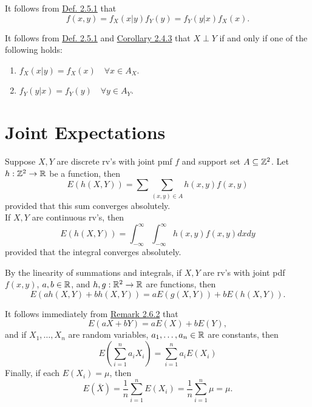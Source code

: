 \documentclass[11pt,fleqn]{book} %
\begin{document}
\begin{remark} It follows from \hyperref[def:251]{Def. 2.5.1} that
\[
f(x, y) = f_X(x | y) f_Y(y) = f_Y(y|x)f_X(x).
\]
\end{remark}

\begin{remark} It follows from \hyperref[def:251]{Def. 2.5.1} and \hyperref[cor:243]{Corollary 2.4.3} that \(X \perp Y\) if and only if one of the following holds:
\begin{enumerate}
\item \(f_X(x|y) = f_X(x) \quad \forall x \in A_X\).
\item \(f_Y(y|x) = f_Y(y) \quad \forall y \in A_Y\).
\end{enumerate}
\end{remark}


\section{Joint Expectations}

\begin{definition} 
Suppose \(X, Y\) are discrete rv's with joint pmf \(f\) and support set \(A \subseteq \mathbb{Z}^2\). Let \(h: \mathbb{Z}^2 \rightarrow \mathbb{R}\) be a function, then
\[
E(h(X, Y)) = \sum\sum_{(x, y) \in A} h(x, y)f(x, y)
\]
provided that this sum converges absolutely.\\
\indent If \(X, Y\) are continuous rv's, then
\[
E(h(X, Y)) = \int_{-\infty}^\infty\int_{-\infty}^\infty h(x, y)f(x, y)dxdy
\]
provided that the integral converges absolutely.
\end{definition}

\begin{remark} \label{rmk:262}
By the linearity of summations and integrals, if \(X, Y\) are rv's with joint pdf \(f(x, y)\), \(a, b \in \mathbb{R}\), and \(h, g: \mathbb{R}^2 \rightarrow \mathbb{R}\) are functions, then
\[
E(ah(X, Y) + bh(X, Y)) = aE(g(X, Y)) + bE(h(X, Y)).
\]
\end{remark}

\begin{remark} \label{rmk:263}
It follows immediately from \hyperref[rmk:262]{Remark 2.6.2} that
\[
E(aX + bY) = aE(X) + bE(Y),
\]
and if \(X_1, \ldots, X_n\) are random variables, \(a_1, \ldots, a_n \in \mathbb{R}\) are constants, then
\[
E\left(\sum_{i=1}^n a_iX_i\right) = \sum_{i=1}^n a_iE(X_i)
\]
\indent Finally, if each \(E(X_i) = \mu\), then
\[
E(\bar{X}) = \frac{1}{n}\sum_{i=1}^nE(X_i) = \frac{1}{n}\sum_{i=1}^n \mu = \mu.
\]
\end{remark}
\end{document}
